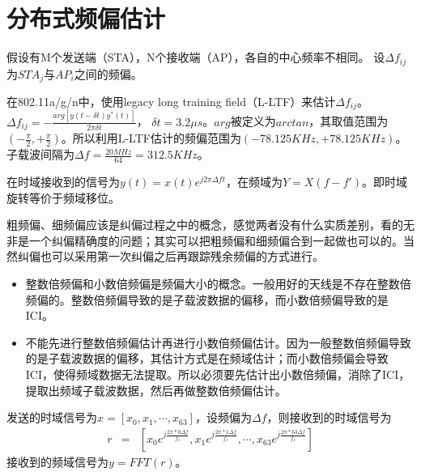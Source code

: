 \section{分布式频偏估计}

假设有M个发送端（STA），N个接收端（AP），各自的中心频率不相同。
设$\Delta f_{ij}$为$STA_{j}$与$AP_{i}$之间的频偏。

在802.11a/g/n中，使用legacy long training field（L-LTF）来估计$\Delta f_{ij}$。
$\Delta f_{ij} = -\frac{arg[ y(t - \delta t)y^{*}(t)  ]}{2 \pi \delta t}$， $\delta t = 3.2 \mu s$。$arg$被定义为$arctan$，其取值范围为$(-\frac{\pi}{2}, +\frac{\pi}{2})$。所以利用L-LTF估计的频偏范围为$(-78.125KHz, +78.125KHz)$。
子载波间隔为$\Delta f = \frac{20MHz}{64} = 312.5KHz$。

在时域接收到的信号为$y(t)=x(t) e^{j2 \pi \Delta f t}$，在频域为$Y = X(f - f')$。即时域旋转等价于频域移位。

粗频偏、细频偏应该是纠偏过程之中的概念，感觉两者没有什么实质差别，看的无非是一个纠偏精确度的问题；其实可以把粗频偏和细频偏合到一起做也可以的。当然纠偏也可以采用第一次纠偏之后再跟踪残余频偏的方式进行。
\begin{itemize}
\item 整数倍频偏和小数倍频偏是频偏大小的概念。一般用好的天线是不存在整数倍频偏的。整数倍频偏导致的是子载波数据的偏移，而小数倍频偏导致的是ICI。
\item 不能先进行整数倍频偏估计再进行小数倍频偏估计。因为一般整数倍频偏导致的是子载波数据的偏移，其估计方式是在频域估计；而小数倍频偏会导致ICI，使得频域数据无法提取。所以必须要先估计出小数倍频偏，消除了ICI，提取出频域子载波数据，然后再做整数倍频偏估计。
\end{itemize}

发送的时域信号为$x=[x_{0}, x_{1}, \cdots, x_{63}]$，设频偏为$\Delta f$，则接收到的时域信号为
\begin{eqnarray}
r&=&[x_{0}e^{j\frac{2\pi*0\Delta f}{f_{s}}}, x_{1}e^{j\frac{2\pi*1\Delta f}{f_{s}}}, \cdots, x_{63}e^{j\frac{2\pi*63\Delta f}{f_{s}}}]
\end{eqnarray}
接收到的频域信号为$y=FFT(r)$。











